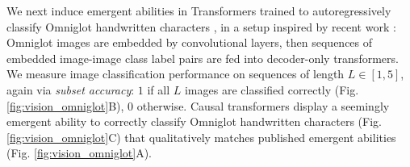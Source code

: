 We next induce emergent abilities in Transformers \cite{vaswani2017attention} trained to autoregressively classify Omniglot handwritten characters \cite{lake2015human}, in a setup inspired by recent work \cite{chan2022data}: Omniglot images are embedded by convolutional layers, then sequences of embedded image-image class label pairs are fed into decoder-only transformers.
We measure image classification performance on sequences of length $L \in [1, 5]$, again via \textit{subset accuracy}: $1$ if all $L$ images are classified correctly (Fig. \ref{fig:vision_omniglot}B), 0 otherwise.
Causal transformers display a seemingly emergent ability to correctly classify Omniglot handwritten characters (Fig. \ref{fig:vision_omniglot}C) that qualitatively matches published emergent abilities (Fig. \ref{fig:vision_omniglot}A).

